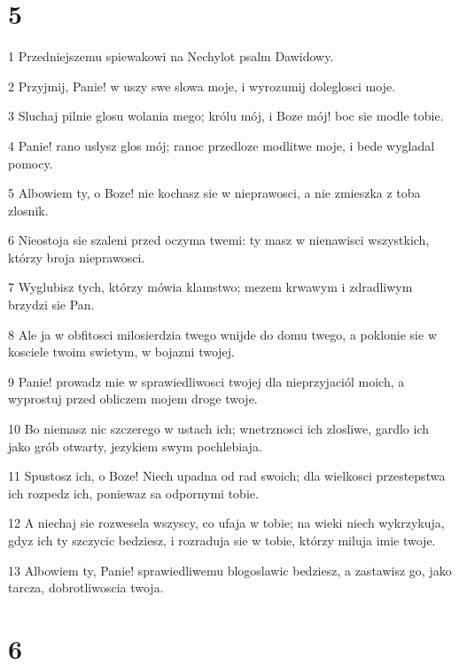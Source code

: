 \chapter{5}

\par 1 Przedniejszemu spiewakowi na Nechylot psalm Dawidowy.
\par 2 Przyjmij, Panie! w uszy swe slowa moje, i wyrozumij doleglosci moje.
\par 3 Sluchaj pilnie glosu wolania mego; królu mój, i Boze mój! boc sie modle tobie.
\par 4 Panie! rano uslysz glos mój; ranoc przedloze modlitwe moje, i bede wygladal pomocy.
\par 5 Albowiem ty, o Boze! nie kochasz sie w nieprawosci, a nie zmieszka z toba zlosnik.
\par 6 Nieostoja sie szaleni przed oczyma twemi: ty masz w nienawisci wszystkich, którzy broja nieprawosci.
\par 7 Wyglubisz tych, którzy mówia klamstwo; mezem krwawym i zdradliwym brzydzi sie Pan.
\par 8 Ale ja w obfitosci milosierdzia twego wnijde do domu twego, a poklonie sie w kosciele twoim swietym, w bojazni twojej.
\par 9 Panie! prowadz mie w sprawiedliwosci twojej dla nieprzyjaciól moich, a wyprostuj przed obliczem mojem droge twoje.
\par 10 Bo niemasz nic szczerego w ustach ich; wnetrznosci ich zlosliwe, gardlo ich jako grób otwarty, jezykiem swym pochlebiaja.
\par 11 Spustosz ich, o Boze! Niech upadna od rad swoich; dla wielkosci przestepstwa ich rozpedz ich, poniewaz sa odpornymi tobie.
\par 12 A niechaj sie rozwesela wszyscy, co ufaja w tobie; na wieki niech wykrzykuja, gdyz ich ty szczycic bedziesz, i rozraduja sie w tobie, którzy miluja imie twoje.
\par 13 Albowiem ty, Panie! sprawiedliwemu blogoslawic bedziesz, a zastawisz go, jako tarcza, dobrotliwoscia twoja.

\chapter{6}

